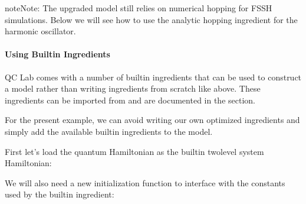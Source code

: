 \documentclass[letterpaper,10pt,english]{sphinxmanual}
\begin{document}
\begin{sphinxadmonition}{note}{Note:}
\sphinxAtStartPar
The upgraded model still relies on numerical hopping for FSSH simulations. Below we will see how to use the analytic hopping ingredient for the harmonic oscillator.
\end{sphinxadmonition}


\paragraph{Using Built\sphinxhyphen{}in Ingredients}
\label{\detokenize{user_guide/model_dev:using-built-in-ingredients}}
\sphinxAtStartPar
QC Lab comes with a number of built\sphinxhyphen{}in ingredients that can be used to construct a model rather than writing ingredients from scratch like above. These ingredients can be imported
from  and are documented in the {\hyperref[\detokenize{software_reference/ingredients/ingredients:ingredients}]{}} section.

\sphinxAtStartPar
For the present example, we can avoid writing our own optimized ingredients and simply add the available built\sphinxhyphen{}in ingredients to the model.

\sphinxAtStartPar
First let’s load the quantum Hamiltonian as the built\sphinxhyphen{}in two\sphinxhyphen{}level system Hamiltonian:

\begin{sphinxVerbatim}[commandchars=\\\{\}]
   
  

  
\end{sphinxVerbatim}

\sphinxAtStartPar
We will also need a new initialization function to interface with the constants used by the built\sphinxhyphen{}in ingredient:
\end{document}
